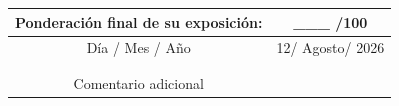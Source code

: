 \documentclass[12pt]{article}
\newcommand{\DiaEvaluacionPesentacion}{12}
\newcommand{\MesEvaluacionPesentacion}{Agosto}
\newcommand{\AnhoEvaluacionPesentacion}{2026}
\begin{document}
\begin{longtable}{|p{3.75cm}|p{3.75cm}|p{3.75cm}|p{3.75cm}|}
  \multicolumn{2}{|c|}{\textbf{Ponderación final de su exposición:}} & \multicolumn{2}{c|}{\_\_\_ /100}                                                                                                                                                                                                                                                                                                                                                                                                                                                 \\ \hline
  \multicolumn{2}{|c|}{Día / Mes / Año}                              & \multicolumn{2}{c|}{\DiaEvaluacionPesentacion / \MesEvaluacionPesentacion / \AnhoEvaluacionPesentacion}                                                                                                                                                                                                                                                                                                                                                                          \\  \hline
  \multicolumn{2}{|c}{ }                                             & \multicolumn{2}{|c|}{ }                                                                                                                                                                                                                                                                                                                                                                                                                                                          \\
  \multicolumn{2}{|c}{ }                                             & \multicolumn{2}{|c|}{ }                                                                                                                                                                                                                                                                                                                                                                                                                                                          \\
  \multicolumn{2}{|c}{Comentario adicional}                          & \multicolumn{2}{|c|}{ }                                                                                                                                                                                                                                                                                                                                                                                                                                                          \\

\end{longtable}
\end{document}

